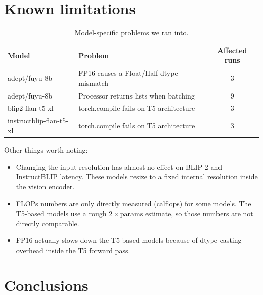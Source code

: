 \documentclass[12pt,a4paper]{article}
\begin{document}
\section{Known limitations}

\begin{table}[H]
\centering
\caption{Model-specific problems we ran into.}
\begin{tabular}{@{}llc@{}}
\toprule
Model & Problem & Affected runs \\
\midrule
adept/fuyu-8b & FP16 causes a Float/Half dtype mismatch & 3 \\
adept/fuyu-8b & Processor returns lists when batching & 9 \\
blip2-flan-t5-xl & torch.compile fails on T5 architecture & 3 \\
instructblip-flan-t5-xl & torch.compile fails on T5 architecture & 3 \\
\bottomrule
\end{tabular}
\end{table}

Other things worth noting:
\begin{itemize}[nosep]
  \item Changing the input resolution has almost no effect on BLIP-2 and InstructBLIP latency.  These models resize to a fixed internal resolution inside the vision encoder.
  \item FLOPs numbers are only directly measured (calflops) for some models.  The T5-based models use a rough $2 \times \text{params}$ estimate, so those numbers are not directly comparable.
  \item FP16 actually slows down the T5-based models because of dtype casting overhead inside the T5 forward pass.
\end{itemize}

\section{Conclusions}
\end{document}
